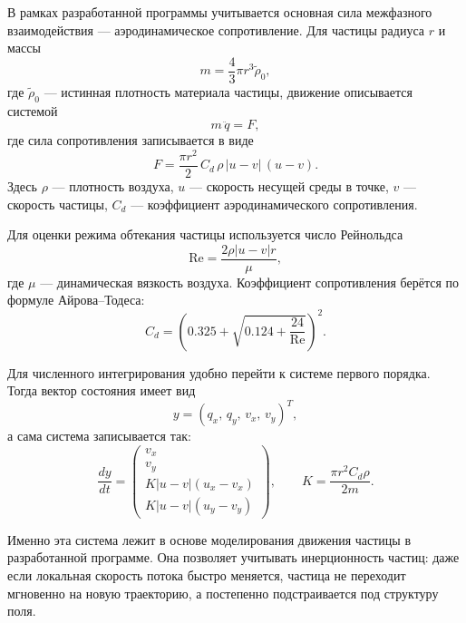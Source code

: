 \documentclass[14pt,a4paper]{extarticle}
\numberwithin{figure}{section}
\numberwithin{table}{section}
\begin{document}
В рамках разработанной программы учитывается основная сила межфазного
взаимодействия --- аэродинамическое сопротивление. Для частицы радиуса $r$ и
массы
\begin{equation}
    m = \frac{4}{3}\pi r^3 \tilde\rho_0,
\end{equation}
где $\tilde\rho_0$ --- истинная плотность материала частицы, движение описывается
системой
\begin{equation}
    m\,\ddot q = F,
\end{equation}
где сила сопротивления записывается в виде
\begin{equation}
    F = \frac{\pi r^2}{2}\,C_d\,\rho\,|u-v|\,(u-v).
\end{equation}
Здесь $\rho$ --- плотность воздуха, $u$ --- скорость несущей среды в точке,
$v$ --- скорость частицы, $C_d$ --- коэффициент аэродинамического сопротивления.

Для оценки режима обтекания частицы используется число Рейнольдса
\begin{equation}
    \mathrm{Re} = \frac{2\rho |u-v|r}{\mu},
\end{equation}
где $\mu$ --- динамическая вязкость воздуха. Коэффициент сопротивления берётся по
формуле Айрова--Тодеса:
\begin{equation}
    C_d = \left(0.325 + \sqrt{0.124 + \frac{24}{\mathrm{Re}}}\right)^2.
\end{equation}

Для численного интегрирования удобно перейти к системе первого порядка. Тогда
вектор состояния имеет вид
\begin{equation}
    y = (q_x,\,q_y,\,v_x,\,v_y)^T,
\end{equation}
а сама система записывается так:
\begin{equation}
    \frac{dy}{dt} =
    \begin{pmatrix}
        v_x \\
        v_y \\
        K|u-v|(u_x-v_x) \\
        K|u-v|(u_y-v_y)
    \end{pmatrix},
    \qquad
    K = \frac{\pi r^2 C_d \rho}{2m}.
\end{equation}

Именно эта система лежит в основе моделирования движения частицы в разработанной
программе. Она позволяет учитывать инерционность частиц: даже если локальная
скорость потока быстро меняется, частица не переходит мгновенно на новую
траекторию, а постепенно подстраивается под структуру поля.
\end{document}

